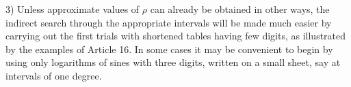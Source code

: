 3) Unless approximate values of $\rho$ can already be obtained in other ways, the indirect search through the appropriate intervals will be made much easier by carrying out the first trials with shortened tables having few digits, as illustrated by the examples of Article 16. In some cases it may be convenient
to begin by using only logarithms of sines with three digits, written on a small sheet, say at intervals of one degree.

